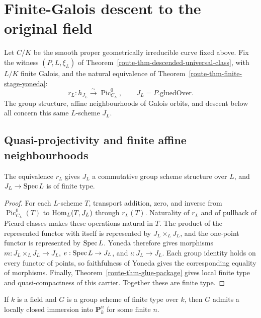 \chapter{Finite-Galois descent to the original field}
\label{route-ch-galois}

Let \(C/K\) be the smooth proper geometrically irreducible curve fixed
above. Fix the witness \((P,L,\xi_L)\) of
Theorem~\ref{route-thm-descended-universal-class}, with \(L/K\) finite
Galois, and the natural equivalence of
Theorem~\ref{route-thm-finite-stage-yoneda}:
\[
  r_L:h_{J_L}\xrightarrow{\sim}\operatorname{Pic}^0_{C_L},
  \qquad J_L=P.\mathrm{gluedOver}.
\]
The group structure, affine neighbourhoods of Galois orbits, and descent
below all concern this same \(L\)-scheme \(J_L\).

\section{Quasi-projectivity and finite affine neighbourhoods}

\begin{lemma}
  \label{route-lem-exact-carrier-group}
  \notready

  The equivalence \(r_L\) gives \(J_L\) a commutative group scheme
  structure over \(L\), and \(J_L\to\operatorname{Spec} L\) is of finite type.
\end{lemma}

\begin{proof}
  For each \(L\)-scheme \(T\), transport addition, zero, and inverse from
  \(\operatorname{Pic}^0_{C_L}(T)\) to \(\operatorname{Hom}_L(T,J_L)\) through
  \(r_L(T)\). Naturality of \(r_L\) and of pullback of Picard classes makes
  these operations natural in \(T\). The product of the represented functor
  with itself is represented by \(J_L\times_L J_L\), and the one-point
  functor is represented by \(\operatorname{Spec} L\). Yoneda therefore gives morphisms
  \(m:J_L\times_L J_L\to J_L\), \(e:\operatorname{Spec} L\to J_L\), and
  \(\iota:J_L\to J_L\). Each group identity holds on every functor of
  points, so faithfulness of Yoneda gives the corresponding equality of
  morphisms. Finally, Theorem~\ref{route-thm-glue-package} gives local
  finite type and quasi-compactness of this carrier. Together these are
  finite type.
\end{proof}

\begin{theorem}
  \label{route-thm-algebraic-group-quasiprojective}
  \notready

  If \(k\) is a field and \(G\) is a group scheme of finite type over
  \(k\), then \(G\) admits a locally closed immersion into
  \(\mathbf P^n_k\) for some finite \(n\).
\end{theorem}

